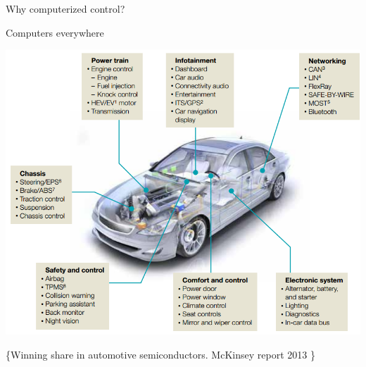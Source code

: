 \documentclass[presentation,aspectratio=169]{beamer}
\begin{document}
\begin{frame}[label={sec:org293b331}]{Why computerized control?}
\end{frame}

\begin{frame}[label={sec:org8cfacea}]{Computers everywhere}
\begin{center}
\includegraphics[width=0.7\linewidth]{../../figures/electronics-in-cars.png}
\end{center}
\begin{LaTeX}
\{\tiny Winning share in automotive semiconductors. McKinsey report 2013 \} 
\end{LaTeX}
\end{frame}
\end{document}
